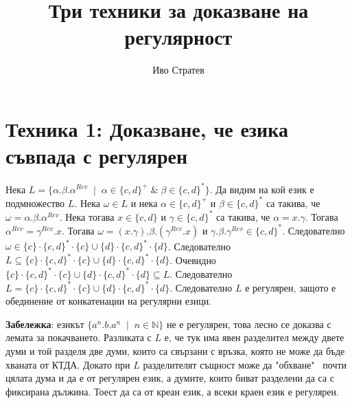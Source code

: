 \documentclass[12pt]{article}
\title{Три техники за доказване на регулярност}
\author{Иво Стратев}
\begin{document}
\maketitle

\section*{Техника 1: Доказване, че езика съвпада с регулярен}
Нека \(L = \{\alpha.\beta.\alpha^{Rev} \;\mid\; \alpha \in \{c, d\}^+ \;\&\; \beta \in \{c, d\}^*\}\).
Да видим на кой език е подмножество \(L\).
Нека \(\omega \in L\) и нека \(\alpha \in \{c, d\}^+\) и \(\beta \in \{c, d\}^*\) са такива, че \(\omega = \alpha.\beta.\alpha^{Rev}\).
Нека тогава \(x \in \{c, d\}\) и \(\gamma \in \{c, d\}^*\) са такива, че \(\alpha = x.\gamma\).
Тогава \(\alpha^{Rev} = \gamma^{Rev} . x\).
Тогава \(\omega = (x.\gamma).\beta.(\gamma^{Rev}.x)\) и \(\gamma.\beta.\gamma^{Rev} \in \{c, d\}^*\).
Следователно \(\omega \in \{c\}\cdot\{c, d\}^* \cdot \{c\} \cup \{d\} \cdot \{c, d\}^* \cdot \{d\}\).
Следователно \(L \subseteq \{c\}\cdot\{c, d\}^* \cdot \{c\} \cup \{d\} \cdot \{c, d\}^* \cdot \{d\}\).
Очевидно \(\{c\}\cdot\{c, d\}^* \cdot \{c\} \cup \{d\} \cdot \{c, d\}^* \cdot \{d\} \subseteq L\).
Следователно \(L = \{c\}\cdot\{c, d\}^* \cdot \{c\} \cup \{d\} \cdot \{c, d\}^* \cdot \{d\}\).
Следователно \(L\) е регулярен, защото е обединение от конкатенации на регулярни езици.

\vspace*{5mm}

\par \textbf{Забележка}: езикът \(\{a^n.b.a^n \;\mid\; n \in \mathbb{N}\}\) не е регулярен,
това лесно се доказва с лемата за покачването. Разликата с \(L\) е, че тук има явен разделител между двете думи и той разделя две думи, които са свързани с връзка, която не може да бъде хваната от КТДА. 
Докато при \(L\) разделителят същност може да "обхване" \, почти цялата дума и да е от регулярен език, а думите, които биват разделени да са с фиксирана дължина. Тоест да са от креан език, а всеки краен език е регулярен.
\end{document}
